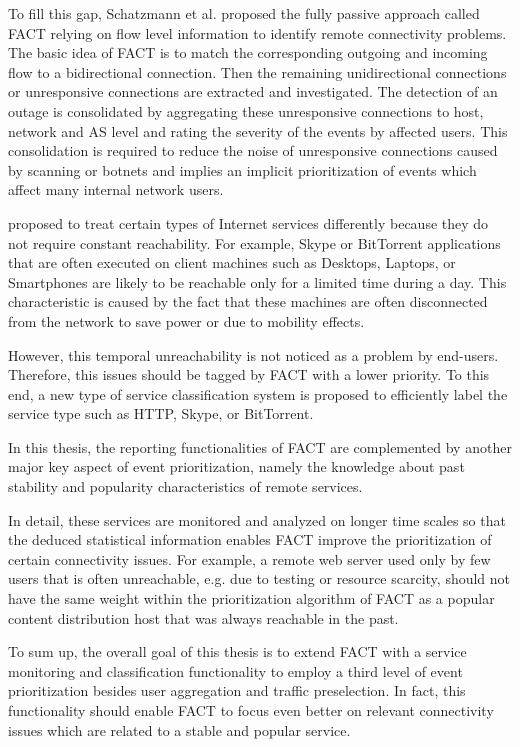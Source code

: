 To fill this gap, Schatzmann et al. proposed the fully passive approach called
FACT \citep{SchatzmannPAM2011} relying on flow level information to identify
remote connectivity problems. The basic idea of FACT is to match the
corresponding outgoing and incoming flow to a bidirectional connection. Then the
remaining unidirectional connections or unresponsive connections are extracted
and investigated. The detection of an outage is consolidated by aggregating
these unresponsive connections to host, network and AS level and rating the
severity of the events by affected users. This consolidation is required to
reduce the noise of unresponsive connections caused by scanning or botnets and
implies an implicit prioritization of events which affect many internal network
users.

\citet{SchatzmanThesis2012} proposed to treat certain types of Internet
services differently because they do not require constant reachability. For
example, Skype or BitTorrent applications that are often executed on client
machines such as Desktops, Laptops, or Smartphones are likely to be reachable
only for a limited time during a day.
This characteristic is caused by the fact that these machines are often
disconnected from the network to save power or due to mobility effects.

However, this temporal unreachability is not noticed as a problem by end-users.
Therefore, this issues should be tagged by FACT with a lower priority.
To this end, a new type of service classification system is proposed to
efficiently label the service type such as HTTP, Skype, or BitTorrent.

In this thesis, the reporting functionalities of FACT are complemented by
another major key aspect of event prioritization, namely the knowledge about
past stability and popularity characteristics of remote services.

In detail, these services are monitored and analyzed on longer time scales so
that the deduced statistical information enables FACT improve the prioritization
of certain connectivity issues. For example, a remote web server used only by
few users that is often unreachable, e.g. due to testing or resource scarcity,
should not have the same weight within the prioritization algorithm of FACT as a
popular content distribution host that was always reachable in the past.

To sum up, the overall goal of this thesis is to extend FACT with a service
monitoring and classification functionality to employ a third level of event
prioritization besides user aggregation and traffic preselection. In fact, this
functionality should enable FACT to focus even better on relevant connectivity
issues which are related to a stable and popular service.

